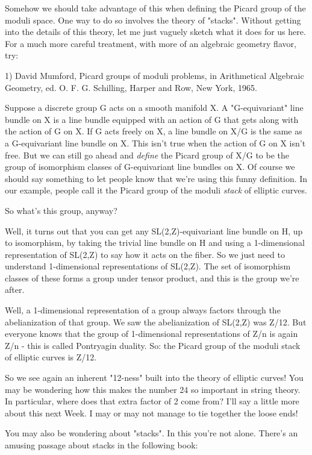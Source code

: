 Somehow we should take advantage of this when defining the Picard
group of the moduli space.  One way to do so involves the theory of
"stacks".  Without getting into the details of this theory, let me 
just vaguely sketch what it does for us here.  For a much more careful
treatment, with more of an algebraic geometry flavor, try:

1) David Mumford, Picard groups of moduli problems, in Arithmetical
Algebraic Geometry, ed. O. F. G. Schilling, Harper and Row, New York, 
1965.

Suppose a discrete group G acts on a smooth manifold X.  A
"G-equivariant" line bundle on X is a line bundle equipped with an
action of G that gets along with the action of G on X.  If G acts
freely on X, a line bundle on X/G is the same as a G-equivariant line
bundle on X.  This isn't true when the action of G on X isn't free.
But we can still go ahead and \emph{define} the Picard group of X/G to be
the group of isomorphism classes of G-equivariant line bundles on X.
Of course we should say something to let people know that we're using
this funny definition.  In our example, people call it the Picard
group of the moduli \emph{stack} of elliptic curves.

So what's this group, anyway?  

Well, it turns out that you can get any SL(2,Z)-equivariant line
bundle on H, up to isomorphism, by taking the trivial line bundle on H
and using a 1-dimensional representation of SL(2,Z) to say how it acts
on the fiber.  So we just need to understand 1-dimensional
representations of SL(2,Z).  The set of isomorphism classes of these
forms a group under tensor product, and this is the group we're after.

Well, a 1-dimensional representation of a group always factors through
the abelianization of that group.  We saw the abelianization of
SL(2,Z) was Z/12.  But everyone knows that the group of 1-dimensional
representations of Z/n is again Z/n - this is called Pontryagin duality.
So: the Picard group of the moduli stack of elliptic curves is Z/12. 

So we see again an inherent "12-ness" built into the theory of
elliptic curves!  You may be wondering how this makes the number 24 so
important in string theory.  In particular, where does that extra
factor of 2 come from?  I'll say a little more about this next Week.
I may or may not manage to tie together the loose ends!

You may also be wondering about "stacks".  In this you're not alone.
There's an amusing passage about stacks in the following book:

